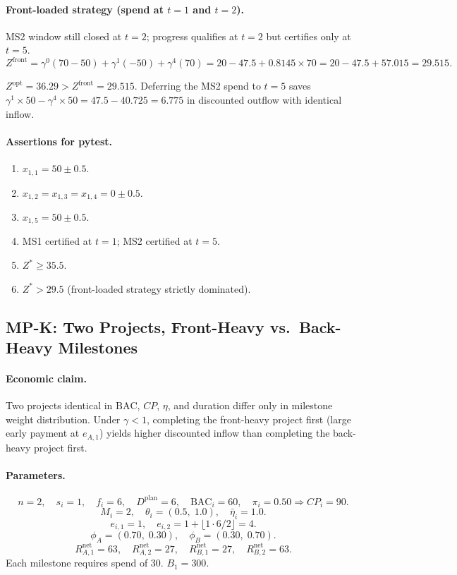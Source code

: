 \documentclass[11pt, a4paper]{article}
\newcommand{\BAC}{\mathrm{BAC}}
\begin{document}
\paragraph{Front-loaded strategy (spend at $t=1$ and $t=2$).}
MS2 window still closed at $t=2$; progress qualifies at $t=2$ but
certifies only at $t=5$.
\[
  Z^{\mathrm{front}} = \gamma^0(70-50) + \gamma^1(-50) + \gamma^4(70)
    = 20 - 47.5 + 0.8145\times70 = 20-47.5+57.015 = \mathbf{29.515}.
\]

$Z^{\mathrm{opt}}=36.29 > Z^{\mathrm{front}}=29.515$. Deferring the
MS2 spend to $t=5$ saves $\gamma^1\times50-\gamma^4\times50
= 47.5-40.725=6.775$ in discounted outflow with identical inflow.

\paragraph{Assertions for pytest.}
\begin{enumerate}[label=A\arabic*.]
  \item $x_{1,1}=50\pm0.5$.
  \item $x_{1,2}=x_{1,3}=x_{1,4}=0\pm0.5$.
  \item $x_{1,5}=50\pm0.5$.
  \item MS1 certified at $t=1$; MS2 certified at $t=5$.
  \item $Z^*\geq35.5$.
  \item $Z^*>29.5$ (front-loaded strategy strictly dominated).
\end{enumerate}

\subsection{MP-K: Two Projects, Front-Heavy vs.\ Back-Heavy Milestones}

\paragraph{Economic claim.}
Two projects identical in $\BAC$, $CP$, $\eta$, and duration differ only
in milestone weight distribution. Under $\gamma<1$, completing the
front-heavy project first (large early payment at $e_{A,1}$) yields
higher discounted inflow than completing the back-heavy project first.

\paragraph{Parameters.}
\[
  n=2,\quad s_i=1,\quad f_i=6,\quad D^{\mathrm{plan}}=6,\quad
  \BAC_i=60,\quad\pi_i=0.50\Rightarrow CP_i=90.
\]
\[
  M_i=2,\quad\theta_i=(0.5,\;1.0),\quad\bar\eta_i=1.0.
\]
\[
  e_{i,1}=1,\quad e_{i,2}=1+\lfloor1\cdot6/2\rfloor=4.
\]
\[
  \phi_A=(0.70,\;0.30),\quad\phi_B=(0.30,\;0.70).
\]
\[
  R_{A,1}^{\mathrm{net}}=63,\quad R_{A,2}^{\mathrm{net}}=27,\quad
  R_{B,1}^{\mathrm{net}}=27,\quad R_{B,2}^{\mathrm{net}}=63.
\]
Each milestone requires spend of 30. $B_1=300$.
\end{document}
